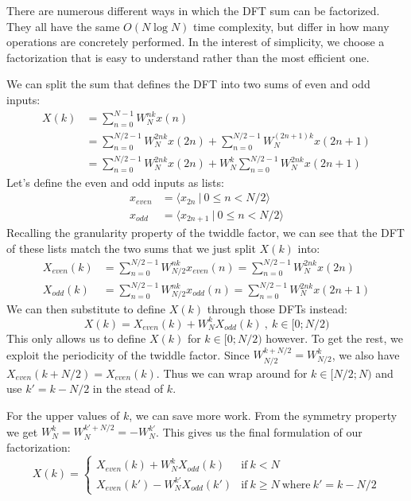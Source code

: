 There are numerous different ways in which the DFT sum can be factorized.
They all have the same $O(N \log N)$ time complexity,
but differ in how many operations are concretely performed.
In the interest of simplicity,
we choose a factorization that is easy to understand rather than the most efficient one.

We can split the sum that defines the DFT into two sums of even and odd inputs:
\begin{align}
    X(k) &= \sum_{n = 0}^{N - 1} W_N^{nk} x(n) \\
    &= \sum_{n = 0}^{N/2 - 1} W_N^{2nk} x(2n) + \sum_{n = 0}^{N/2 - 1} W_N^{(2n + 1)k} x(2n + 1) \\
    &= \sum_{n = 0}^{N/2 - 1} W_N^{2nk} x(2n) + W_N^k \sum_{n = 0}^{N/2 - 1} W_N^{2nk} x(2n + 1) %
\end{align}
Let's define the even and odd inputs as lists:
\begin{align}
    x_\textit{even} &= \langle x_{2n} ~|~ 0 \leq n < N/2 \rangle\\
    x_\textit{odd}  &= \langle x_{2n + 1} ~|~ 0 \leq n < N/2 \rangle
\end{align}
Recalling the granularity property of the twiddle factor,
we can see that the DFT of these lists match the two sums that we just split $X(k)$ into:
\begin{align}
    X_\textit{even}(k) &= \sum_{n = 0}^{N/2 - 1} W_{N/2}^{nk} x_\textit{even}(n) = \sum_{n = 0}^{N/2 - 1} W_{N}^{2nk} x(2n) \\
    X_\textit{odd}(k) &= \sum_{n = 0}^{N/2 - 1} W_{N/2}^{nk} x_\textit{odd}(n) = \sum_{n = 0}^{N/2 - 1} W_{N}^{2nk} x(2n + 1)
\end{align}
We can then substitute to define $X(k)$ through those DFTs instead:
\begin{equation}
    X(k) = X_\textit{even}(k) + W_N^k X_\textit{odd}(k) ~,~ k \in [0;N/2)
\end{equation}
This only allows us to define $X(k)$ for $k \in [0;N/2)$ however.
To get the rest, we exploit the periodicity of the twiddle factor.
Since $W_{N/2}^{k + N/2} = W_{N/2}^k$, we also have $X_\textit{even}(k + N/2) = X_\textit{even}(k)$.
Thus we can wrap around for $k \in [N/2;N)$ and use $k' = k - N/2$ in the stead of $k$.

For the upper values of $k$, we can save more work.
From the symmetry property we get $W_N^k = W_N^{k' + N/2} = -W_N^{k'}$.
This gives us the final formulation of our factorization:
\begin{equation}
    X(k) =
    \begin{cases}
        X_\textit{even}(k) + W_N^k X_\textit{odd}(k) &\text{if}~k < N \\
        X_\textit{even}(k') - W_N^{k'} X_\textit{odd}(k') &\text{if}~k \geq N ~\text{where}~k' = k - N/2
    \end{cases}
\end{equation}

